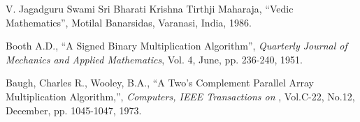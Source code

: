 \begin{thebibliography}{1}

 V. Jagadguru Swami Sri Bharati Krishna Tirthji Maharaja, ``Vedic Mathematics'', Motilal Banarsidas, Varanasi, India, 1986.


 Booth A.D., ``A Signed Binary Multiplication Algorithm'', \emph{Quarterly Journal of Mechanics and Applied Mathematics}, Vol. 4, June, pp. 236-240, 1951.

 Baugh, Charles R., Wooley, B.A., ``A Two's Complement Parallel Array Multiplication Algorithm,'', \emph{Computers, IEEE Transactions on }, Vol.C-22, No.12, December, pp. 1045-1047, 1973.


\end{thebibliography}
